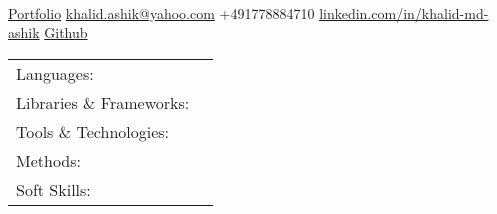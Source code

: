 \documentclass[]{awesome-cv}
\begin{document}
    
\begin{center}
	  \\
	\vspace{2mm}
	\href{https://k-ashik.github.io/Khalid-The-Data-Analyst.github.io/}{{\textcolor{darkblue}{\faGlobe} Portfolio}}
	\hspace{2mm}
	\href{mailto:khalid.ashik@yahoo.com}{{\textcolor{darkblue}{\faEnvelope} khalid.ashik@yahoo.com}}
	\hspace{2mm} 
 	{\textcolor{darkblue}{\faPhone} +491778884710}
	\hspace{2mm}
	\href{https://www.linkedin.com/in/khalid-md-ashik/}{{\textcolor{darkblue}{\faLinkedin} linkedin.com/in/khalid-md-ashik}}
	\hspace{2mm} 
	\href{https://github.com/K-Ashik}{{\textcolor{darkblue}{\faGithub} Github}}
\end{center}
\vspace{-4mm}
\begin{cventries}
	\cventry
	{}
	{\def\arraystretch{1.15}{\begin{tabular}{ l l }
		Languages:  & \hspace{1mm} {\skill{ Python, R, SQL }} \\
		Libraries \& Frameworks:  & \hspace{1mm} {\skill{ Pandas, Numpy, Tensorflow, Keras }} \\
		Tools \& Technologies:  & \hspace{1mm} {\skill{ Tableau, PowerBI, Excel, MS Office, Git, Jupyter Notebook}} \\
		Methods:  & \hspace{1mm} {\skill{ A/B Testing, Web Scraping, Machine Learning, Deep Learning }} \\
		Soft Skills:  & \hspace{1mm} {\skill{ Research, Presentation, Collaborative, Data Analysis}} \\
		\end{tabular}}}
	{}
	{}
	{}
\end{cventries}
\end{document}
